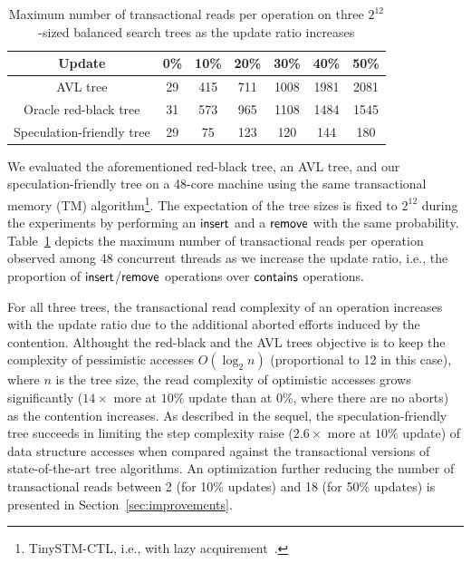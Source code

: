 \begin{table}[!ht]
 \centering
	\begin{tabular}{|c|c|c|c|c|c|c|}
  \hline
  Update & 0\% & 10\% & 20\% & 30\% & 40\% & 50\%\\  \hline\hline
  AVL tree & 29 & 415 & 711 & 1008 & 1981 & 2081  \\ \hline
  Oracle red-black tree & 31 & 573 & 965 & 1108 & 1484 & 1545   \\ \hline
  Speculation-friendly tree & 29 & 75 & 123  & 120 & 144 & 180   \\ \hline
 \end{tabular}
 \caption{Maximum number of transactional reads per operation on three $2^{12}$-sized balanced search trees as the update ratio increases}
 \label{table:complexity}
\end{table}

We evaluated the aforementioned red-black tree, an AVL tree, 
and our speculation-friendly tree on a 48-core machine using the same transactional memory (TM) algorithm\footnote{TinySTM-CTL, i.e., with lazy 
acquirement~\cite{FFR08}.}.
The expectation of the tree sizes is fixed to $2^{12}$ during the experiments by performing an 
$\lit{insert}$ and a $\lit{remove}$ with the same probability.
Table~\ref{table:complexity} depicts the maximum number of transactional reads
per operation observed among 48 concurrent threads as we increase the update ratio, i.e., the proportion of $\lit{insert}$/$\lit{remove}$ operations over $\lit{contains}$ operations.

For all three trees, the transactional read complexity of an operation increases with the update ratio due to the additional aborted efforts induced by the 
contention. 
Althought the red-black and the AVL trees objective is to keep the complexity of pessimistic accesses $O(\log_2 n)$ (proportional to 12 in this case), where $n$ is the tree size,
the read complexity of optimistic accesses grows significantly ($14\times$ more at $10\%$ update than at 0\%, where there are no aborts) as the contention increases.
As described in the sequel, the speculation-friendly tree succeeds in limiting the step complexity raise ($2.6\times$ more at $10\%$ update) of data structure accesses when 
compared against the transactional versions of state-of-the-art tree algorithms. An optimization further reducing the number of transactional reads between 2 (for 10\% updates) and 
18 (for 50\% updates) is presented in Section~\ref{sec:improvements}.

